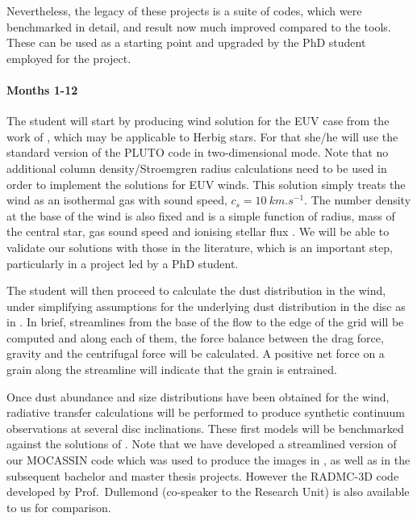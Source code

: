 \documentclass[10pt,fleqn,twoside]{article}
\begin{document}
 Nevertheless, the legacy of these projects is a suite of
codes, which were benchmarked in detail, and result now much improved
compared to the \citet{2011MNRAS.411.1104O} tools. These can be
used as a starting point and upgraded by the PhD student employed for the project.  


\paragraph{Months 1-12}

The student will start by producing wind solution for the EUV case
from the work of \citet{2004ApJ...607..890F}, which may be applicable
to Herbig stars. For that she/he will use the standard version of the
PLUTO code \citep{2007ApJS..170..228M, 2012A&A...545A.152M} in
two-dimensional mode. Note that no additional column density/Stroemgren radius
calculations need to be used in order to implement the \citet{2004ApJ...607..890F}
solutions for EUV winds. This solution simply treats the
wind as an isothermal gas with sound speed, $c_s =
\SI{10}{km.s^{-1}}$.
The number density at the base of the wind is also fixed and is a simple
function of radius, mass of the central star, gas sound speed and
ionising stellar flux 
\citep{1994ApJ...428..654H,2004ApJ...607..890F, 2009ApJ...704..989A}. 
We will be able to validate our solutions with those in the
literature, which is an important step, particularly in a project led
by a PhD student. 

The student will then proceed to calculate the dust
distribution in the wind, under simplifying assumptions for the
underlying dust distribution in the disc as in \citet{2011MNRAS.411.1104O}. In
brief, streamlines from the base of the flow to the edge of the grid
will be computed and along each of them, the force balance between the
drag force, gravity and the centrifugal force will be calculated. A
positive net force on a grain along the streamline will indicate that
the grain is entrained.

Once dust abundance and size distributions have been obtained for the
wind, radiative transfer calculations will be performed to produce
synthetic continuum observations at several disc inclinations. 
These first models will be benchmarked against the solutions
of \citet{2011MNRAS.411.1104O}. Note that we have developed a
streamlined version of our MOCASSIN code which was used to produce the
images in \citet{2011MNRAS.411.1104O}, as well as in the subsequent
bachelor and master thesis projects. However the RADMC-3D code
developed by Prof.\ Dullemond (co-speaker to the Research Unit) is also
available to us for comparison. 
\end{document}
